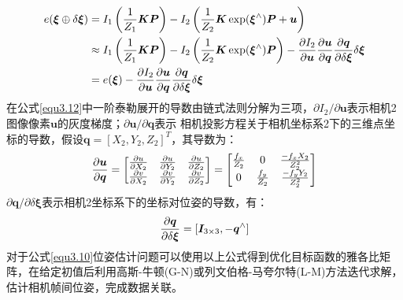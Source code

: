 \begin{equation}
\label{equ3.12}
\begin{aligned}
e(\boldsymbol{\xi}\oplus \delta \boldsymbol{\xi}) &= I_1\left({1 \over Z_1} \boldsymbol{K} \boldsymbol{P} \right) - I_2 \left({1 \over Z_2} \boldsymbol{K} \exp (\boldsymbol{\xi}^{\wedge}) \boldsymbol{P}+ \boldsymbol{u} \right) 
\\ 
& \approx I_1\left({1 \over Z_1} \boldsymbol{K} \boldsymbol{P} \right) - I_2 \left({1 \over Z_2} \boldsymbol{K} \exp (\boldsymbol{\xi}^{\wedge}) \boldsymbol{P} \right) - {\partial I_2 \over \partial \boldsymbol{u}} {\partial \boldsymbol{u} \over \partial \boldsymbol{q}} {\partial \boldsymbol{q} \over \partial \delta \boldsymbol{\xi}} \delta \boldsymbol{\xi}
\\
& = e(\boldsymbol{\xi}) - {\partial I_2 \over \partial \boldsymbol{u}} {\partial \boldsymbol{u} \over \partial \boldsymbol{q}} {\partial \boldsymbol{q} \over \partial \delta \boldsymbol{\xi}} \delta \boldsymbol{\xi}
\end{aligned}
\end{equation}
在公式\eqref{equ3.12}中一阶泰勒展开的导数由链式法则分解为三项，$\partial I_2 / \partial \boldsymbol{u}$表示相机2图像像素$\boldsymbol{u}$的灰度梯度；$\partial \boldsymbol{u} / \partial \boldsymbol{q}$表示
相机投影方程关于相机坐标系2下的三维点坐标的导数，假设$\boldsymbol{q} = \left[X_2,Y_2,Z_2 \right]^T$，其导数为：
\begin{equation}
\label{equ3.13}
{ \partial \boldsymbol{u} \over \partial \boldsymbol{q} } = 
\begin{bmatrix}
\partial u \over \partial X_2 & \partial u \over \partial Y_2 & \partial u \over \partial Z_2 \cr
\partial v \over \partial X_2 & \partial v \over \partial Y_2 & \partial v \over \partial Z_2 \cr
\end{bmatrix} = 
\begin{bmatrix}
f_x \over Z_2 & 0 & -f_x X_2 \over Z_2^2 \cr
0 & f_y \over Z_2 & - f_y Y_2 \over Z_2^2 \cr
\end{bmatrix}
\end{equation}
${\partial \boldsymbol{q} / \partial \delta \boldsymbol{\xi}}$表示相机2坐标系下的坐标对位姿的导数，有：
\begin{equation}
\label{equ3.14}
{\partial \boldsymbol{q} \over \partial \delta \boldsymbol{\xi}} = \left[\boldsymbol{I}_{3\times 3},-\boldsymbol{q}^{\wedge} \right]
\end{equation}
对于公式\eqref{equ3.10}位姿估计问题可以使用以上公式得到优化目标函数的雅各比矩阵，在给定初值后利用高斯-牛顿(G-N)或列文伯格-马夸尔特(L-M)方法迭代求解，估计相机帧间位姿，完成数据关联。




